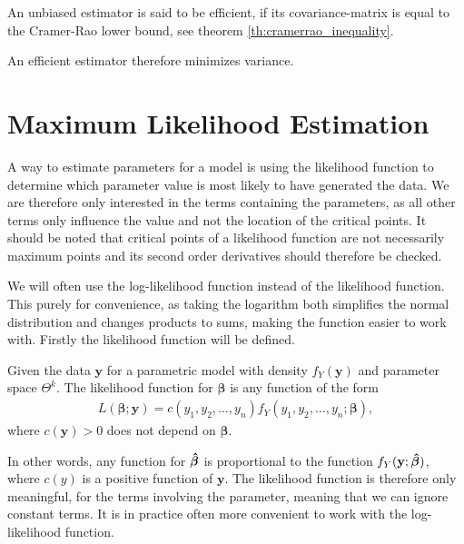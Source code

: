 \begin{definition} 
\label{def:efficient_estimator}
An unbiased estimator is said to be efficient, if its covariance-matrix is equal to the Cramer-Rao lower bound, see theorem \ref{th:cramerrao_inequality}.
\end{definition}

An efficient estimator therefore minimizes variance. 
 
\section{Maximum Likelihood Estimation}

A way to estimate parameters for a model is using the likelihood function to determine which parameter value is most likely to have generated the data. We are therefore only interested in the terms containing the parameters, as all other terms only influence the value and not the location of the critical points. It should be noted that critical points of a likelihood function are not necessarily maximum points and its second order derivatives should therefore be checked.   

We will often use the log-likelihood function instead of the likelihood function. This purely for convenience, as taking the logarithm both simplifies the normal distribution and changes products to sums, making the function easier to work with. Firstly the likelihood function will be defined.

\begin{definition} 
\label{def:likelihood_function}
Given the data $\textbf{y}$ for a parametric model with density $f_Y(\textbf{y})$ and parameter space $\Theta^k$. The likelihood function for $\boldsymbol{\beta}$ is any function of the form 
\begin{align*}
    L(\boldsymbol{\beta}; \textbf{y}) = c(y_1, y_2, \ldots, y_n)f_Y(y_1, y_2, \ldots, y_n; \boldsymbol{\beta}), 
\end{align*}
where $c(\textbf{y})>0$ does not depend on $\boldsymbol{\beta}$. 
\end{definition}

In other words, any function for $\operatorname{\boldsymbol{\hat{\beta}}}$ is proportional to the function $f_Y(\textbf{y}; \operatorname{\boldsymbol{\hat{\beta}}})$, where $c(y)$ is a positive function of $\textbf{y}$. 
The likelihood function is therefore only meaningful, for the terms involving the parameter, meaning that we can ignore constant terms. 
It is in practice often more convenient to work with the log-likelihood function. 

